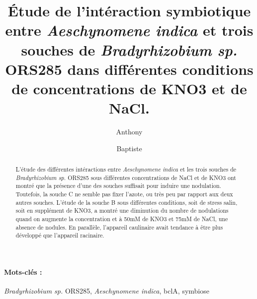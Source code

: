 \documentclass[12pt,a4paper,onecolumn]{article}
\author{Anthony \bsc{Lhopital} \and Baptiste \bsc{Rouger}}
\title{Étude de l'intéraction symbiotique entre \textit{Aeschynomene indica} et trois souches de \textit{Bradyrhizobium sp.} ORS285 dans différentes conditions de concentrations de KNO3 et de NaCl.}
\begin{document}
	\maketitle

	\paragraph{Mots-clés :}
	\textit{Bradyrhizobium sp.} ORS285, \textit{Aeschynomene indica}, bclA, symbiose


	\begin{abstract}
		L'étude des différentes intéractions entre \textit{Aeschynomene indica} et les trois souches de \textit{Bradyrhizobium sp.} ORS285 sous différentes concentrations de NaCl et de KNO3 ont montré que la présence d'une des souches suffisait pour induire une nodulation. Toutefois, la souche C ne semble pas fixer l'azote, ou très peu par rapport aux deux autres souches. L'étude de la souche B sous différentes conditions, soit de stress salin, soit en supplément de KNO3, a montré une diminution du nombre de nodulations quand on augmente la concentration et à 50mM de KNO3 et 75mM de NaCl, une absence de nodules. En parallèle, l'appareil caulinaire avait tendance à être plus développé que l'appareil racinaire.


	\end{abstract}
\end{document}
